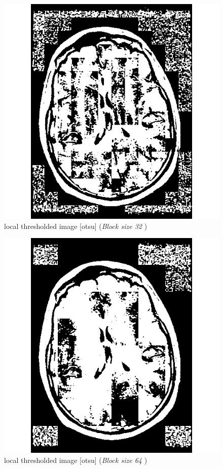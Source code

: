\documentclass[letterpaper, 12 pt, conference ,onecolumn]{ieeeconf}  %
\begin{document}
\begin{figure}[h!]
\includegraphics[width=0.4\paperwidth]{otsu-thresholding/local/MRI-local-threshold-otsu32.jpg}
\centering
\caption{local thresholded image [otsu] (\textit{Block size 32 }) }
\label{fig:MRI-local-threshold-otsu32}
\end{figure}


\begin{figure}[h!]
\includegraphics[width=0.4\paperwidth]{otsu-thresholding/local/MRI-local-threshold-otsu64.jpg}
\centering
\caption{local thresholded image [otsu] (\textit{Block size 64 }) }
\label{fig:MRI-local-threshold-otsu64}
\end{figure}
\end{document}
